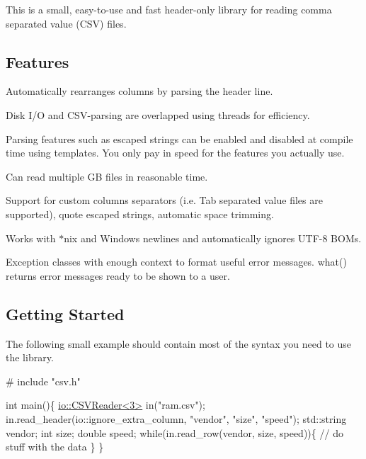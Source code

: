 This is a small, easy-\/to-\/use and fast header-\/only library for reading comma separated value (C\+SV) files.

\subsection*{Features}


\begin{DoxyItemize}
\item Automatically rearranges columns by parsing the header line.
\item Disk I/O and C\+S\+V-\/parsing are overlapped using threads for efficiency.
\item Parsing features such as escaped strings can be enabled and disabled at compile time using templates. You only pay in speed for the features you actually use.
\item Can read multiple GB files in reasonable time.
\item Support for custom columns separators (i.\+e. Tab separated value files are supported), quote escaped strings, automatic space trimming.
\item Works with {\ttfamily $\ast$}nix and Windows newlines and automatically ignores U\+T\+F-\/8 B\+O\+Ms.
\item Exception classes with enough context to format useful error messages. what() returns error messages ready to be shown to a user.
\end{DoxyItemize}

\subsection*{Getting Started}

The following small example should contain most of the syntax you need to use the library.


\begin{DoxyCode}
\textcolor{preprocessor}{# include "csv.h"}

\textcolor{keywordtype}{int} main()\{
  \hyperlink{classio_1_1_c_s_v_reader}{io::CSVReader<3>} in(\textcolor{stringliteral}{"ram.csv"});
  in.read\_header(io::ignore\_extra\_column, \textcolor{stringliteral}{"vendor"}, \textcolor{stringliteral}{"size"}, \textcolor{stringliteral}{"speed"});
  std::string vendor; \textcolor{keywordtype}{int} size; \textcolor{keywordtype}{double} speed;
  \textcolor{keywordflow}{while}(in.read\_row(vendor, size, speed))\{
    \textcolor{comment}{// do stuff with the data}
  \}
\}
\end{DoxyCode}


